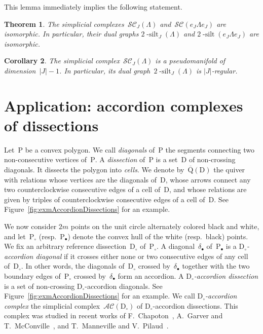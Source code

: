 \documentclass{amsart}
\newtheorem{theorem}{Theorem}%
\newtheorem{corollary}[theorem]{Corollary}
\theoremstyle{definition}
\newcommand{\fref}[1]{Figure~\ref{#1}} %
\newcommand{\darkblue}{\color{darkblue}} %
\newcommand{\defn}[1]{\textsl{\darkblue #1}} %
\newcommand{\polygon}{\mathrm{P}} %
\newcommand{\dissection}{\mathrm{D}} %
\newcommand{\accordionComplex}{\mathcal{AC}} %
\newcommand{\quiver}{\mathrm{Q}} %
\newcommand{\silt}{2 \! \operatorname{-silt}}
\newcommand{\siltingComplex}{\mathcal{SC}}
\begin{document}
This lemma immediately implies the following statement.

\begin{theorem}
The simplicial complexes~$\siltingComplex_J(\Lambda)$ and~$\siltingComplex(e_J \Lambda e_J)$ are isomorphic.
In particular, their dual graphs $\silt_J(\Lambda)$ and $\silt(e_J \Lambda e_J)$ are isomorphic.
\end{theorem}

\begin{corollary}
The simplicial complex~$\siltingComplex_J(\Lambda)$ is a pseudomanifold of dimension~$|J|-1$. In particular, its dual graph~$\silt_J(\Lambda)$ is $|J|$-regular.
\end{corollary}


\section{Application: accordion complexes of dissections}
\label{sec:accordions}

Let~$\polygon$ be a convex polygon.
We call \defn{diagonals} of~$\polygon$ the segments connecting two non-consecutive vertices of~$\polygon$.
A \defn{dissection} of~$\polygon$ is a set~$\dissection$ of non-crossing diagonals.
It dissects the polygon into \defn{cells}.
We denote by~$\overline{\quiver}(\dissection)$ the quiver with relations whose vertices are the diagonals of~$\dissection$, whose arrows connect any two counterclockwise consecutive edges of a cell of~$\dissection$, and whose relations are given by triples of counterclockwise consecutive edges of a cell of~$\dissection$.
See \fref{fig:exmAccordionDissections} for an example.

We now consider $2m$ points on the unit circle alternately colored black and white, and let~$\polygon_\circ$ (resp.~$\polygon_\bullet$) denote the convex hull of the white (resp.~black) points.
We fix an arbitrary reference dissection~$\dissection_\circ$ of~$\polygon_\circ$.
A diagonal~$\delta_\bullet$ of~$\polygon_\bullet$ is a \defn{$\dissection_\circ$-accordion diagonal} if it crosses either none or two consecutive edges of any cell of~$\dissection_\circ$.
In other words, the diagonals of~$\dissection_\circ$ crossed by~$\delta_\bullet$ together with the two boundary edges of~$\polygon_\circ$ crossed by~$\delta_\bullet$ form an accordion.
A \defn{$\dissection_\circ$-accordion dissection} is a set of non-crossing \mbox{$\dissection_\circ$-accordion} diagonals. 
See \fref{fig:exmAccordionDissections} for an example.
We call \defn{$\dissection_\circ$-accordion complex} the simplicial complex~$\accordionComplex(\dissection_\circ)$ of $\dissection_\circ$-accordion dissections.
This complex was studied in recent works of F.~Chapoton~\cite{Chapoton-quadrangulations}, A.~Garver and T.~McConville~\cite{GarverMcConville}, and T.~Manneville and V.~Pilaud~\cite{MannevillePilaud-accordion}.
\end{document}
